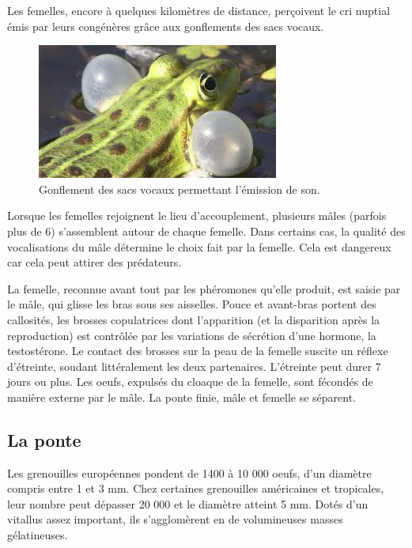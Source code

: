 Les femelles, encore à quelques kilomètres de distance, perçoivent le cri nuptial émis par leurs congénères grâce aux gonflements des sacs vocaux.


\begin{figure}
	\begin{center}
		\includegraphics[width=.9\textwidth]{laRepro/sacvocal.jpg}
		\caption{Gonflement des sacs vocaux permettant l'émission de son.}%
		\label{fig:grossejoue}
	\end{center}
\end{figure}

Lorsque les femelles rejoignent le lieu d’accouplement, plusieurs mâles (parfois plus de 6) s’assemblent autour de chaque femelle. 
Dans certains cas, la qualité des vocalisations du mâle détermine le choix fait par la femelle. Cela est dangereux car cela peut attirer des prédateurs.

La femelle, reconnue avant tout par les phéromones qu’elle produit, est saisie par le mâle, qui glisse les bras sous ses aisselles. 
Pouce et avant-bras portent des callosités, les brosses copulatrices dont l’apparition (et la disparition après la reproduction) est contrôlée par les variations de sécrétion d’une hormone, la testostérone.
Le contact des brosses sur la peau de la femelle suscite un réflexe d’étreinte, soudant littéralement les deux partenaires. 
L’étreinte peut durer 7 jours ou plus. Les oeufs, expulsés du cloaque de la femelle, sont fécondés de manière externe par le mâle. La ponte finie, mâle et femelle se séparent.

 
\subsection{La ponte}

Les grenouilles européennes pondent de 1400 à 10 000 oeufs, d’un diamètre compris entre 1 et 3 mm. 
Chez certaines grenouilles américaines et tropicales, leur nombre peut dépasser 20 000 et le diamètre atteint 5 mm. 
Dotés d’un vitallus assez important, ils s’agglomèrent en de volumineuses masses gélatineuses.

